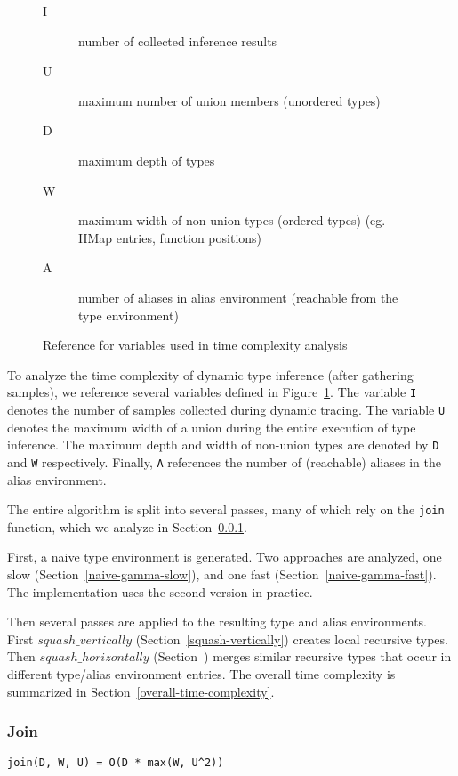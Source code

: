 \begin{figure}
\begin{mdframed}
\begin{description}
  \item [I] number of collected inference results
  \item [U] maximum number of union members (unordered types)
  \item [D] maximum depth of types
  \item [W] maximum width of non-union types (ordered types) (eg. HMap entries, function positions)
  \item [A] number of aliases in alias environment (reachable from the type environment)
\end{description}
\end{mdframed}
\caption{Reference for variables used in time complexity analysis}
\label{time-complexity-vars}
\end{figure}

To analyze the time complexity of dynamic type inference (after
gathering samples), we reference several variables 
defined in Figure~\ref{time-complexity-vars}.
The variable \texttt{I} denotes the number of samples
collected during dynamic tracing. The variable \texttt{U}
denotes the maximum width of a union during the entire execution
of type inference.
The maximum depth and width of non-union types are denoted by
\texttt{D} and \texttt{W} respectively.
Finally, \texttt{A} references the number of (reachable) aliases in the
alias environment.

The entire algorithm is split into several passes, many of which
rely on the \texttt{join} function, which we analyze in Section~\ref{join}.

First, a naive type environment is generated. Two approaches
are analyzed, 
one slow (Section~\ref{naive-gamma-slow}),
and one fast (Section~\ref{naive-gamma-fast}).
The implementation uses the second version in practice.

Then several passes are applied to the resulting type and
alias environments. First $squash\_vertically$
(Section~\ref{squash-vertically}) creates local recursive
types.
Then $squash\_horizontally$ (Section~\label{squash-horizontally})
merges similar recursive types that occur in different type/alias
environment entries.
The overall time complexity is summarized in Section~\ref{overall-time-complexity}.

\subsubsection{Join}
\label{join}
\begin{verbatim}
join(D, W, U) = O(D * max(W, U^2))
\end{verbatim}

